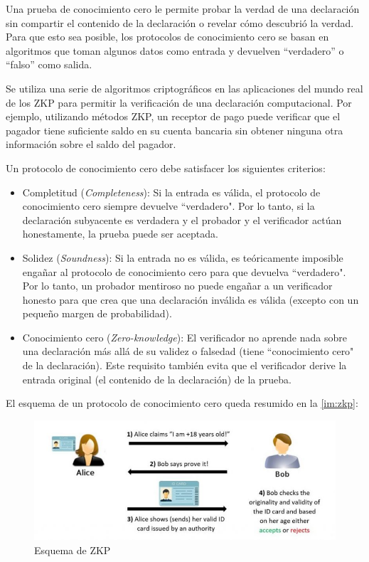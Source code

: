 Una prueba de conocimiento cero le permite probar la verdad de una declaración sin compartir el contenido de la declaración o revelar cómo descubrió la verdad. Para que esto sea posible, los protocolos de conocimiento cero se basan en algoritmos que toman algunos datos como entrada y devuelven ``verdadero'' o ``falso'' como salida.

Se utiliza una serie de algoritmos criptográficos en las aplicaciones del mundo real de los ZKP para permitir la verificación de una declaración computacional. Por ejemplo, utilizando métodos ZKP, un receptor de pago puede verificar que el pagador tiene suficiente saldo en su cuenta bancaria sin obtener ninguna otra información sobre el saldo del pagador.

Un protocolo de conocimiento cero debe satisfacer los siguientes criterios:
\begin{itemize}
    \item Completitud (\emph{Completeness}): Si la entrada es válida, el protocolo de conocimiento cero siempre devuelve ``verdadero". Por lo tanto, si la declaración subyacente es verdadera y el probador y el verificador actúan honestamente, la prueba puede ser aceptada.

    \item Solidez (\emph{Soundness}): Si la entrada no es válida, es teóricamente imposible engañar al protocolo de conocimiento cero para que devuelva ``verdadero". Por lo tanto, un probador mentiroso no puede engañar a un verificador honesto para que crea que una declaración inválida es válida (excepto con un pequeño margen de probabilidad).

    \item Conocimiento cero (\emph{Zero-knowledge}): El verificador no aprende nada sobre una declaración más allá de su validez o falsedad (tiene ``conocimiento cero" de la declaración). Este requisito también evita que el verificador derive la entrada original (el contenido de la declaración) de la prueba.
\end{itemize}

El esquema de un protocolo de conocimiento cero queda resumido en la \autoref{im:zkp}:
\begin{figure}[ht]
    \centering
    \includegraphics[width=\textwidth]{images/zkp.jpg}
    \caption{Esquema de ZKP \cite{ZKP}}
    \label{im:zkp}
\end{figure}

